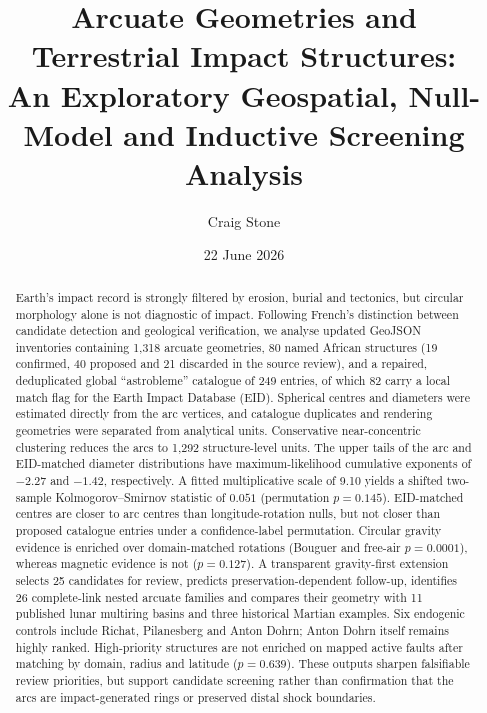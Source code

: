 \documentclass[11pt]{article}
\title{Arcuate Geometries and Terrestrial Impact Structures:\\An Exploratory Geospatial, Null-Model and Inductive Screening Analysis}
\author{Craig Stone}
\date{22 June 2026}
\begin{document}
\maketitle

\begin{abstract}
Earth's impact record is strongly filtered by erosion, burial and tectonics, but circular morphology alone is not diagnostic of impact. Following French's distinction between candidate detection and geological verification, we analyse updated GeoJSON inventories containing 1,318 arcuate geometries, 80 named African structures (19 confirmed, 40 proposed and 21 discarded in the source review), and a repaired, deduplicated global ``astrobleme'' catalogue of 249 entries, of which 82 carry a local match flag for the Earth Impact Database (EID). Spherical centres and diameters were estimated directly from the arc vertices, and catalogue duplicates and rendering geometries were separated from analytical units. Conservative near-concentric clustering reduces the arcs to 1,292 structure-level units. The upper tails of the arc and EID-matched diameter distributions have maximum-likelihood cumulative exponents of $-2.27$ and $-1.42$, respectively. A fitted multiplicative scale of 9.10 yields a shifted two-sample Kolmogorov--Smirnov statistic of $0.051$ (permutation $p=0.145$). EID-matched centres are closer to arc centres than longitude-rotation nulls, but not closer than proposed catalogue entries under a confidence-label permutation. Circular gravity evidence is enriched over domain-matched rotations (Bouguer and free-air $p=0.0001$), whereas magnetic evidence is not ($p=0.127$). A transparent gravity-first extension selects 25 candidates for review, predicts preservation-dependent follow-up, identifies 26 complete-link nested arcuate families and compares their geometry with 11 published lunar multiring basins and three historical Martian examples. Six endogenic controls include Richat, Pilanesberg and Anton Dohrn; Anton Dohrn itself remains highly ranked. High-priority structures are not enriched on mapped active faults after matching by domain, radius and latitude ($p=0.639$). These outputs sharpen falsifiable review priorities, but support candidate screening rather than confirmation that the arcs are impact-generated rings or preserved distal shock boundaries.
\end{abstract}
\end{document}
